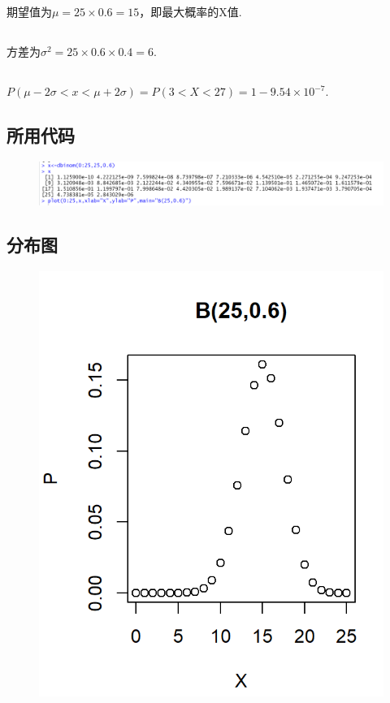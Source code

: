 \documentclass{article}
\begin{document}
\begin{CJK}{UTF8}{gbsn}
\subsection{}
期望值为$\mu=25\times 0.6=15$，即最大概率的X值.
\subsection{}
方差为$\sigma^{2}=25\times 0.6\times 0.4=6$.
\subsection{}
$P(\mu-2\sigma<x<\mu+2\sigma)=P(3<X<27)=1-9.54\times 10^{-7}$.
\subsection{所用代码}
\begin{figure}[htbp]
    \centering
    \includegraphics[scale=0.5]{code.png}
\end{figure}
\subsection{分布图}
\begin{figure}[htbp]
    \centering
    \includegraphics[scale=0.5]{plot.png}
\end{figure}
\end{CJK}
\end{document}
